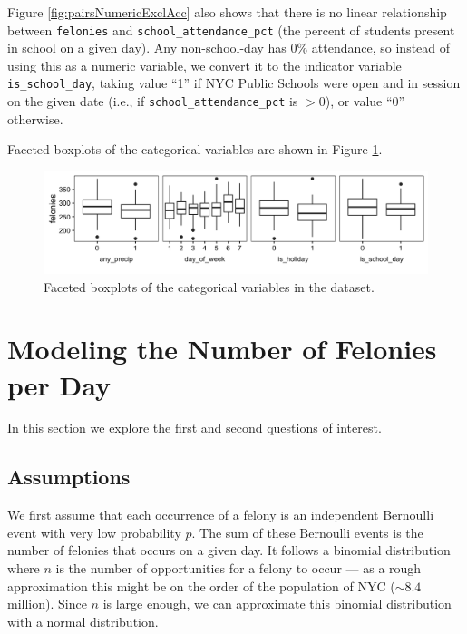 \documentclass[11pt,notitlepage]{article}
\begin{document}
Figure \ref{fig:pairsNumericExclAcc} also shows that there is no linear relationship between \texttt{felonies} and \texttt{school_attendance_pct} (the percent of students present in school on a given day). Any non-school-day has 0\% attendance, so instead of using this as a numeric variable, we convert it to the indicator variable \texttt{is_school_day}, taking value ``1'' if NYC Public Schools were open and in session on the given date (i.e., if \texttt{school_attendance_pct} is $>0$), or value ``0'' otherwise.

Faceted boxplots of the categorical variables are shown in Figure \ref{fig:facetCategorical}.

\begin{figure}[!h]
	\centering
	\captionsetup{width=0.9\textwidth}
	\includegraphics[width=6in]{figures/facetCategorical.png}
	\caption{Faceted boxplots of the categorical variables in the dataset.}
	\label{fig:facetCategorical}
\end{figure}

\section{Modeling the Number of Felonies per Day}

In this section we explore the first and second questions of interest.

\subsection{Assumptions}

We first assume that each occurrence of a felony is an independent Bernoulli event with very low probability $p$. The sum of these Bernoulli events is the number of felonies that occurs on a given day. It follows a binomial distribution where $n$ is the number of opportunities for a felony to occur --- as a rough approximation this might be on the order of the population of NYC ($\sim 8.4$ million). Since $n$ is large enough, we can approximate this binomial distribution with a normal distribution.
\end{document}
